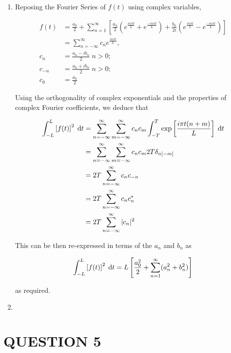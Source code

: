 \documentclass[a4paper]{article}
\begin{document}
\begin{enumerate}
	\item Reposing the Fourier Series of $ f(t) $ using complex variables,
	
	\begin{align*}
	f(t) & = \frac{a_{0}}{2} + \sum_{n=1}^{\infty}  \left[   \frac{a_{n}}{2} \left(   e^{\frac{i n \pi t}{L}} + e^{\frac{- i n \pi t}{L}} \right) + \frac{b_{n}}{2i} \left( e^{\frac{i n \pi t}{L}} - e^{\frac{-i n \pi t}{L}} \right)   \right]  \\
	& = \sum_{n=-\infty}^{\infty}  c_{n} e^{\frac{i n \pi t}{L}}, \\
	c_{n} & = \frac{a_{n} - i b_{n}}{2} \; n > 0 ; \\
	c_{-n} & = \frac{a_{n} + i b_{n}}{2} \; n > 0 ; \\
	c_{0} & = \frac{a_{0}}{2}
	\end{align*}
	
	Using the orthogonality of complex exponentials and the properties of complex Fourier coefficients, we deduce that
	
	\begin{align*}
	\int_{-L}^{L} \left[  f(t) \right]^{2} \; \mathrm{d} t  & = \sum_{n = - \infty}^{\infty} \sum_{m = -\infty}^{\infty} c_{n} c_{m} \int_{-T}^{T} \exp \left[   \frac{i \pi t (n + m)}{L} \right]  \; \mathrm{d} t \\
	& = \sum_{n = - \infty}^{\infty} \sum_{m = -\infty}^{\infty} c_{n} c_{m} 2 T \delta_{n[-m]}  \; \\ 
	& = 2 T \sum_{n = - \infty}^{\infty} c_{n} c_{-n} \\
	& = 2 T \sum_{n = - \infty}^{\infty} c_{n} c_{n}^{*} \\
	& = 2 T \sum_{n = - \infty}^{\infty} | c_{n} |^{2} \\
	\end{align*}
	
	This can be then re-expressed in terms of the $ a_{n} $ and $ b_{n} $ as 
	
	\[ \int_{-L}^{L} \left[  f(t) \right]^{2} \; \mathrm{d} t  = L  \left[   \frac{a_{0}^{2}}{2} +\sum_{n=1}^{\infty} (a_{n}^{2} + b_{n}^{2}) \right]  \]
	
	as required. 
	 
	\item 
	
\end{enumerate}



\section{QUESTION 5}
\end{document}
